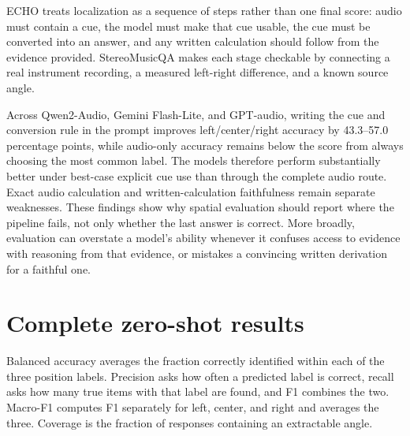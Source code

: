 \documentclass{article}
\begin{document}
ECHO treats localization as a sequence of steps rather than one final score: audio must contain a cue, the model must make that cue usable, the cue must be converted into an answer, and any written calculation should follow from the evidence provided. StereoMusicQA makes each stage checkable by connecting a real instrument recording, a measured left-right difference, and a known source angle.

Across Qwen2-Audio, Gemini Flash-Lite, and GPT-audio, writing the cue and conversion rule in the prompt improves left/center/right accuracy by 43.3--57.0 percentage points, while audio-only accuracy remains below the score from always choosing the most common label. The models therefore perform substantially better under best-case explicit cue use than through the complete audio route. Exact audio calculation and written-calculation faithfulness remain separate weaknesses. These findings show why spatial evaluation should report where the pipeline fails, not only whether the last answer is correct. More broadly, evaluation can overstate a model's ability whenever it confuses access to evidence with reasoning from that evidence, or mistakes a convincing written derivation for a faithful one.



\appendix
\makeatletter
{}
\renewcommand{\thefigure}{\thesection\arabic{figure}}
\renewcommand{\thetable}{\thesection\arabic{table}}
\makeatother

\section{Complete zero-shot results}

Balanced accuracy averages the fraction correctly identified within each of the three position labels. Precision asks how often a predicted label is correct, recall asks how many true items with that label are found, and F1 combines the two. Macro-F1 computes F1 separately for left, center, and right and averages the three. Coverage is the fraction of responses containing an extractable angle.
\end{document}
